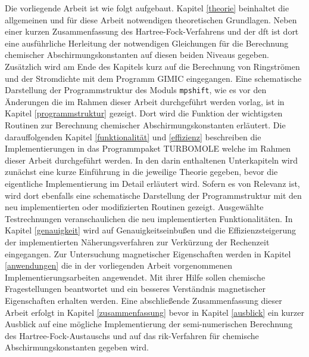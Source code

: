 \bigskip
Die vorliegende Arbeit ist wie folgt aufgebaut. Kapitel \ref{theorie} beinhaltet die allgemeinen und für diese Arbeit notwendigen theoretischen Grundlagen. Neben einer kurzen Zusammenfassung des Hartree-Fock-Verfahrens und der \acl{dft} ist dort eine ausführliche Herleitung der notwendigen Gleichungen für die Berechnung chemischer Abschirmungskonstanten auf diesen beiden Niveaus gegeben. Zusätzlich wird am Ende des Kapitels kurz auf die Berechnung von Ringströmen und der Stromdichte mit dem Programm GIMIC eingegangen. Eine schematische Darstellung der Programmstruktur des Moduls \texttt{mpshift}, wie es vor den Änderungen die im Rahmen dieser Arbeit durchgeführt werden vorlag, ist in Kapitel \ref{programmstruktur} gezeigt. Dort wird die Funktion der wichtigsten Routinen zur Berechnung chemischer Abschirmungskonstanten erläutert. Die darauffolgenden Kapitel \ref{funktionalität} und \ref{effizienz} beschreiben die Implementierungen in das Programmpaket \textsc{TURBOMOLE} welche im Rahmen dieser Arbeit durchgeführt werden. In den darin enthaltenen Unterkapiteln wird zunächst eine kurze Einführung in die jeweilige Theorie gegeben, bevor die eigentliche Implementierung im Detail erläutert wird. Sofern es von Relevanz ist, wird dort ebenfalls eine schematische Darstellung der Programmstruktur mit den neu implementierten oder modifizierten Routinen gezeigt. Ausgewählte Testrechnungen veranschaulichen die neu implementierten Funktionalitäten. In Kapitel \ref{genauigkeit} wird auf Genauigkeitseinbußen und die Effizienzsteigerung der implementierten Näherungsverfahren zur Verkürzung der Rechenzeit eingegangen. Zur Untersuchung magnetischer Eigenschaften werden in Kapitel \ref{anwendungen} die in der vorliegenden Arbeit vorgenommenen Implementierungsarbeiten angewendet. Mit ihrer Hilfe sollen chemische Fragestellungen beantwortet und ein besseres Verständnis magnetischer Eigenschaften erhalten werden. Eine abschließende Zusammenfassung dieser Arbeit erfolgt in Kapitel \ref{zusammenfassung} bevor in Kapitel \ref{ausblick} ein kurzer Ausblick auf eine mögliche Implementierung der semi-numerischen Berechnung des Hartree-Fock-Austauschs und auf das \ac{rik}-Verfahren für chemische Abschirmungskonstanten gegeben wird.
